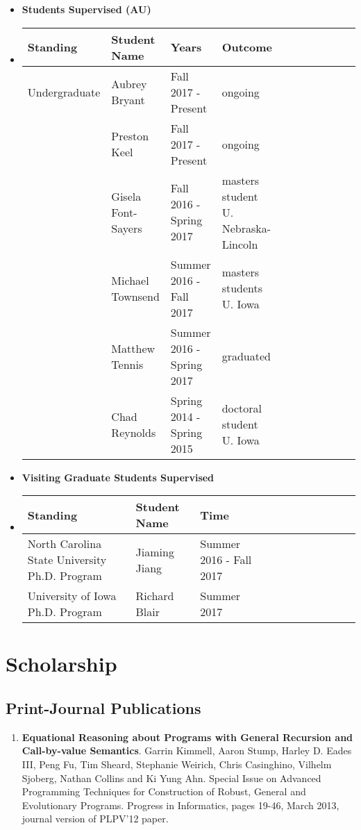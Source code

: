 \documentclass{article}
\begin{document}
\begin{itemize}
  \item[] \textbf{Students Supervised (AU)}\\
  \item[] 
    \begin{tabular}{|l|l|l|l|l|l|l|l|l|l|l|}
    \hline
    \textbf{Standing} & \textbf{Student Name} & \textbf{Years} & \textbf{Outcome}\\  
    \hline
    Undergraduate     & Aubrey Bryant         & Fall 2017 - Present       & ongoing\\
                      & Preston Keel          & Fall 2017 - Present       & ongoing\\
                      & Gisela Font-Sayers    & Fall 2016 - Spring 2017   & masters student U. Nebraska-Lincoln\\
                      & Michael Townsend      & Summer 2016 - Fall 2017   & masters students U. Iowa\\
                      & Matthew Tennis        & Summer 2016 - Spring 2017 & graduated\\
                      & Chad Reynolds         & Spring 2014 - Spring 2015 & doctoral student U. Iowa\\
    \hline
    \end{tabular}
  \item[] \textbf{Visiting Graduate Students Supervised}\\
  \item[] 
    \begin{tabular}{|l|l|l|l|l|l|l|l|l|l|l|}
    \hline
    \textbf{Standing} & \textbf{Student Name} & \textbf{Time}\\  
    \hline
   North Carolina State University Ph.D. Program     & Jiaming Jiang       & Summer 2016 - Fall 2017\\
   University of Iowa Ph.D. Program                  & Richard Blair       & Summer 2017\\
    \hline
  \end{tabular}    
  \end{itemize}
  
  \section{Scholarship}
  \label{sec:scholarship}
  
  \subsection{Print-Journal Publications}
  \begin{enumerate}
  \item \textbf{Equational Reasoning about Programs with General Recursion and Call-by-value Semantics}.
  Garrin Kimmell, Aaron Stump, Harley D. Eades III, Peng Fu, Tim Sheard, Stephanie Weirich, 
  Chris Casinghino, Vilhelm Sjoberg, Nathan Collins and Ki Yung Ahn. 
  Special Issue on Advanced Programming Techniques for Construction of Robust, General and Evolutionary 
  Programs. Progress in Informatics, pages 19-46, March 2013, journal version of PLPV’12 paper. 
  \end{enumerate}
\end{document}
